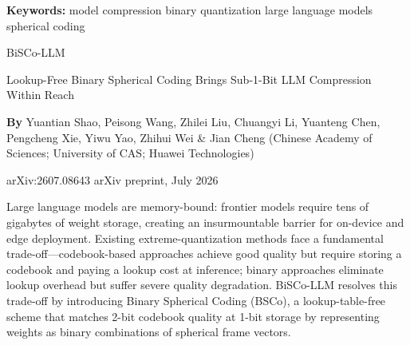 \documentclass[10pt,twocolumn]{article}
\begin{document}
\setlength{\parindent}{0pt}
\setlength{\parskip}{4pt}

{\small\color{keywordgray}\textbf{Keywords:}
  model compression \textbullet{}
  binary quantization \textbullet{}
  large language models \textbullet{}
  spherical coding}\par\vspace{4pt}

{\LARGE\bfseries\raggedright
  BiSCo-LLM}\par\vspace{4pt}

{\large\itshape\raggedright
  Lookup-Free Binary Spherical Coding Brings
  Sub-1-Bit LLM Compression Within Reach}\par\vspace{6pt}

{\small\textbf{By} Yuantian Shao, Peisong Wang, Zhilei Liu,
  Chuangyi Li, Yuanteng Chen, Pengcheng Xie, Yiwu Yao, Zhihui Wei \& Jian Cheng
  (Chinese Academy of Sciences; University of CAS; Huawei Technologies)}\par\vspace{2pt}

{\small\color{keywordgray}arXiv:2607.08643 \textbullet{}
  arXiv preprint, July 2026}
\par\vspace{2pt}\noindent{\color{rulered}\rule{\columnwidth}{0.6pt}}\vspace{6pt}

Large language models are memory-bound: frontier models require tens of
gigabytes of weight storage, creating an insurmountable barrier for
on-device and edge deployment. Existing extreme-quantization methods
face a fundamental trade-off---codebook-based approaches achieve good
quality but require storing a codebook and paying a lookup cost at
inference; binary approaches eliminate lookup overhead but suffer severe
quality degradation. BiSCo-LLM resolves this trade-off by introducing
Binary Spherical Coding (BSCo), a lookup-table-free scheme that matches
2-bit codebook quality at 1-bit storage by representing weights as
binary combinations of spherical frame vectors.
\end{document}
